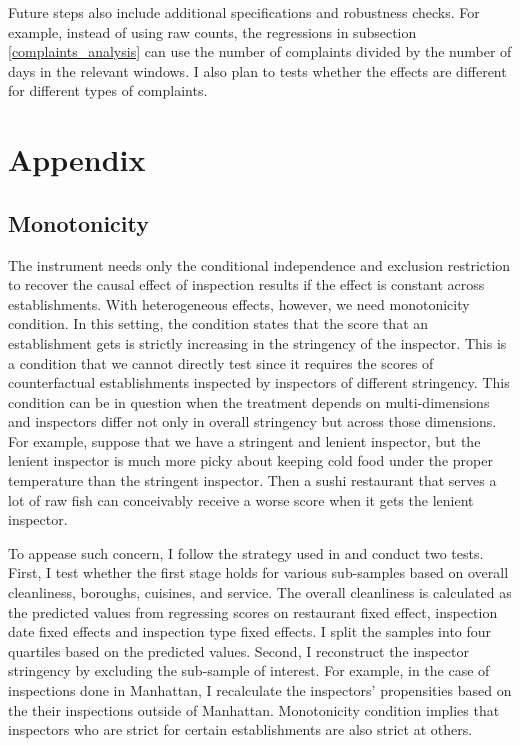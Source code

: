 \documentclass[11pt]{article}
\begin{document}
Future steps also include additional specifications and robustness checks. For example, instead of using raw counts, the regressions in subsection \ref{complaints_analysis} can use the number of complaints divided by the number of days in the relevant windows. I also plan to tests whether the effects are different for different types of complaints. 

\newpage





\newpage

\section{Appendix}

\subsection{Monotonicity}

The instrument needs only the conditional independence and exclusion restriction to recover the causal effect of inspection results if the effect is constant across establishments. With heterogeneous effects, however, we need monotonicity condition. In this setting, the condition states that the score that an establishment gets is strictly increasing in the stringency of the inspector. This is a condition that we cannot directly test since it requires the scores of counterfactual establishments inspected by inspectors of different stringency. This condition can be in question when the treatment depends on multi-dimensions and inspectors differ not only in overall stringency but across those dimensions. For example, suppose that we have a stringent and lenient inspector, but the lenient inspector is much more picky about keeping cold food under the proper temperature than the stringent inspector. Then a sushi restaurant that serves a lot of raw fish can conceivably receive a worse score when it gets the lenient inspector. 

To appease such concern, I follow the strategy used in \cite{bhuller_16} and conduct two tests. First, I test whether the first stage holds for various sub-samples based on overall cleanliness, boroughs, cuisines, and service. The overall cleanliness is calculated as the predicted values from regressing scores on restaurant fixed effect, inspection date fixed effects and inspection type fixed effects. I split the samples into four quartiles based on the predicted values. Second, I reconstruct the inspector stringency by excluding the sub-sample of interest. For example, in the case of inspections done in Manhattan, I recalculate the inspectors' propensities based on the their inspections outside of Manhattan. Monotonicity condition implies that inspectors who are strict for certain establishments are also strict at others. 
\end{document}
